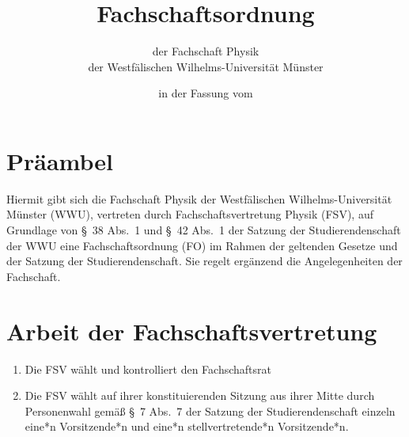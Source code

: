 


\pagestyle{scrheadings}

\title{Fachschaftsordnung}
\subtitle{der Fachschaft Physik\\
der Westfälischen Wilhelms-Universität Münster}
\date{in der Fassung vom }
\author{}



\maketitle

\section{Präambel}
Hiermit gibt sich die Fachschaft Physik der Westfälischen Wilhelms-Universität Münster (WWU), vertreten durch Fachschaftsvertretung Physik (FSV), auf Grundlage von §~38 Abs.~1 und §~42 Abs.~1 der Satzung der Studierendenschaft der WWU eine Fachschaftsordnung (FO) im Rahmen der geltenden Gesetze und der Satzung der Studierendenschaft.
Sie regelt ergänzend die Angelegenheiten der Fachschaft.

\section{Arbeit der Fachschaftsvertretung}
\begin{enumerate}
	\item Die FSV wählt und kontrolliert den Fachschaftsrat
	\item Die FSV wählt auf ihrer konstituierenden Sitzung aus ihrer Mitte durch Personenwahl gemäß §~7 Abs.~7 der Satzung der Studierendenschaft einzeln eine*n Vorsitzende*n und eine*n stellvertretende*n Vorsitzende*n.
\end{enumerate}



